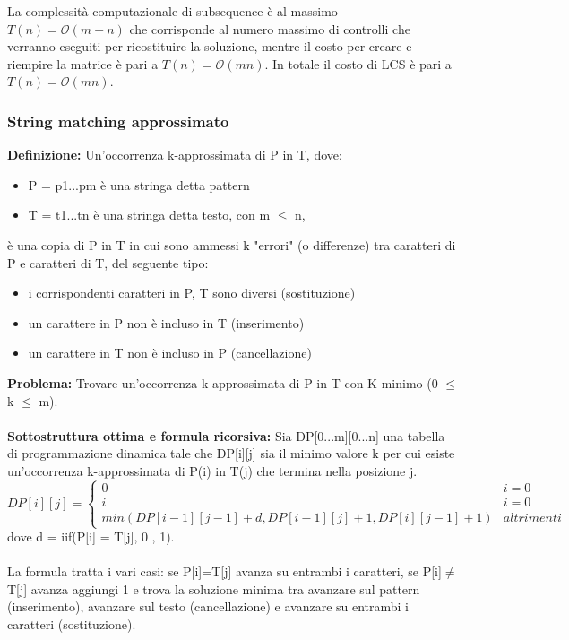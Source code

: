 \documentclass[../cheatSheetAlgoritmi.tex]{subfiles}
\begin{document}
La complessità computazionale di subsequence è al massimo $T(n) = \mathcal{O}(m+n)$ che  corrisponde al numero massimo di controlli che verranno eseguiti per ricostituire la soluzione, mentre il costo per creare e riempire la matrice è pari a $T(n) = \mathcal{O}(mn)$. In totale il costo di LCS è pari a $T(n) = \mathcal{O}(mn)$.

\subsubsection{String matching approssimato}
\textbf{Definizione:} Un'occorrenza k-approssimata di P in T, dove: 
\begin{itemize}
	\item P = p1...pm è una stringa detta pattern
	\item T = t1...tn è una stringa detta testo, con m $\leq$ n,
\end{itemize}
è una copia di P in T in cui sono ammessi k "errori" (o differenze) tra caratteri di P e caratteri di T, del seguente tipo:
\begin{itemize}
	\item i corrispondenti caratteri in P, T sono diversi (sostituzione) 
	\item un carattere in P non è incluso in T (inserimento)
	\item un carattere in T non è incluso in P (cancellazione)\\
\end{itemize}
\textbf{Problema:} Trovare un'occorrenza k-approssimata di P in T con K minimo (0 $\leq$ k $\leq$ m).\\\\
\textbf{Sottostruttura ottima e formula ricorsiva:} Sia DP[0...m][0...n] una tabella di programmazione dinamica tale che DP[i][j] sia il minimo valore k per cui esiste un’occorrenza k-approssimata di P(i) in T(j) che termina nella posizione j. \\
\begin{equation*}
  	DP[i][j] =\begin{cases}
    	0 & \text{$i = 0$}\\
    	i & \text{$i = 0$}\\
    	min(DP[i-1][j-1] + d , DP[i-1][j] + 1, DP[i][j-1] + 1)  & \text{$altrimenti$}   	
  	\end{cases}
\end{equation*}
dove d = iif(P[i] = T[j], 0 , 1).\\\\
La formula tratta i vari casi: se P[i]=T[j] avanza su entrambi i caratteri, se P[i]$\neq$T[j] avanza aggiungi 1 e trova la soluzione minima tra avanzare sul pattern (inserimento), avanzare sul testo (cancellazione) e avanzare su entrambi i caratteri (sostituzione).\\\\
\end{document}
